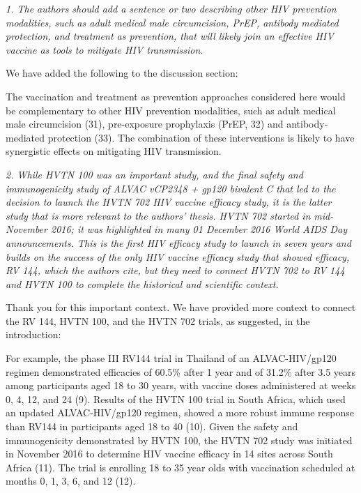 \documentclass[12pt]{jpmletter}
\newenvironment{original}{\it}{}
\begin{document}
\begin{letter}{}
\begin{original}
      1. The authors should add a sentence or two describing other HIV
      prevention modalities, such as adult medical male circumcision,
      PrEP, antibody mediated protection, and treatment as prevention,
      that will likely join an effective HIV vaccine as tools to
      mitigate HIV transmission.
    \end{original}

    We have added the following to the discussion section:
    \begin{quoting}
      The vaccination and treatment as prevention approaches
      considered here would be complementary to other HIV prevention
      modalities, such as adult medical male circumcision (31),
      pre-exposure prophylaxis (PrEP, 32) and antibody-mediated
      protection (33). The combination of these interventions is
      likely to have synergistic effects on mitigating HIV
      transmission.
    \end{quoting}
    
    \begin{original}
      2. While HVTN 100 was an important study, and the final safety
      and immunogenicity study of ALVAC vCP2348 + gp120 bivalent C
      that led to the decision to launch the HVTN 702 HIV vaccine
      efficacy study, it is the latter study that is more relevant to
      the authors' thesis. HVTN 702 started in mid-November 2016; it
      was highlighted in many 01 December 2016 World AIDS Day
      announcements. This is the first HIV efficacy study to launch in
      seven years and builds on the success of the only HIV vaccine
      efficacy study that showed efficacy, RV 144, which the authors
      cite, but they need to connect HVTN 702 to RV 144 and HVTN 100
      to complete the historical and scientific context.
    \end{original}
    
    Thank you for this important context.  We have provided more
    context to connect the RV 144, HVTN 100, and the HVTN 702 trials,
    as suggested, in the introduction:
    \begin{quoting}
      For example, the phase III RV144 trial in Thailand of an
      ALVAC-HIV/gp120 regimen demonstrated efficacies of 60.5\% after
      1 year and of 31.2\% after 3.5 years among participants aged 18
      to 30 years, with vaccine doses administered at weeks 0, 4, 12,
      and 24 (9). Results of the HVTN 100 trial in South Africa,
      which used an updated ALVAC-HIV/gp120 regimen, showed a more
      robust immune response than RV144 in participants aged 18 to 40
      (10).  Given the safety and immunogenicity demonstrated by HVTN
      100, the HVTN 702 study was initiated in November 2016 to
      determine HIV vaccine efficacy in 14 sites across South Africa
      (11). The trial is enrolling 18 to 35 year olds with vaccination
      scheduled at months 0, 1, 3, 6, and 12 (12).
    \end{quoting}


\end{letter}
\end{document}
